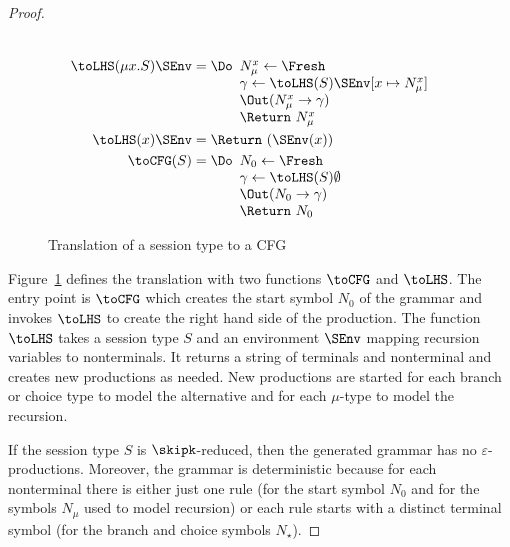 \begin{proof}
\begin{figure}[tp]
\begin{align*}
\begin{array}[t]{l}
                                                 \end{array}
      \\
      \toLHS (\mu x.S)\SEnv &= \Do
                             \begin{array}[t]{l}
                               N_\mu^x \gets \Fresh \\
                               \gamma \gets \toLHS (S)\SEnv[x \mapsto N_\mu^x] \\
                               \Out (N_\mu^x \to \gamma) \\
                               \Return\ N_\mu^x
                             \end{array}
      \\
      \toLHS (x) \SEnv &= \Return\ (\SEnv (x))
      \\
      \toCFG (S) &= \Do
                   \begin{array}[t]{l}
                     N_0 \gets \Fresh \\
                     \gamma \gets \toLHS (S)\emptyset \\
                     \Out (N_0 \to \gamma) \\
                     \Return\ N_0
                   \end{array}
    \end{align*}
    \caption{Translation of a session type to a CFG}
    \label{fig:session-to-grammar}
  \end{figure}

  Figure~\ref{fig:session-to-grammar} defines the translation with two functions $\toCFG$ and $\toLHS$. The entry point
  is $\toCFG$ which creates the start symbol $N_0$ of the grammar and invokes $\toLHS$ to create the
  right hand side of the production. The function $\toLHS$ takes a session type $S$ and an environment
  $\SEnv$ mapping recursion variables to nonterminals. It returns a string of terminals and
  nonterminal and creates new productions as needed. New productions are started for each branch or
  choice type to model the alternative and for each $\mu$-type to model the recursion.

  If the session type $S$ is  $\skipk$-reduced, then the generated grammar has no
  $\varepsilon$-productions. Moreover, the grammar is deterministic because for each nonterminal there is
  either just one rule (for the start symbol $N_0$ and for the symbols $N_\mu$ used to model
  recursion) or each rule starts with a distinct terminal symbol (for the branch and choice symbols $N_\star$). 


\end{proof}
